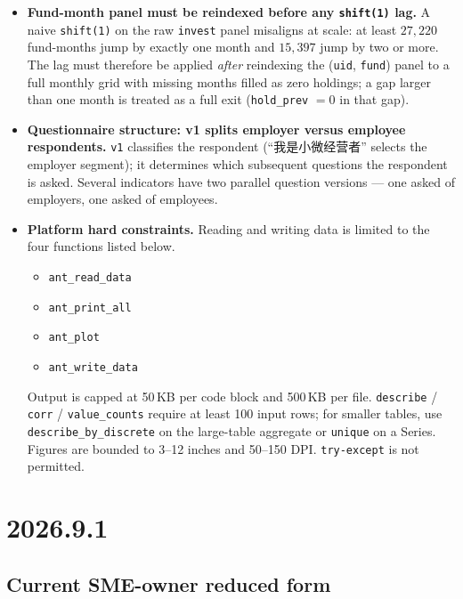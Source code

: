 \documentclass[11pt,letterpaper,english,final]{article}
\begin{document}
\begin{itemize}
\item \textbf{Fund-month panel must be reindexed before any \texttt{shift(1)} lag.} A naive \texttt{shift(1)} on the raw \texttt{invest} panel misaligns at scale: at least $27{,}220$ fund-months jump by exactly one month and $15{,}397$ jump by two or more. The lag must therefore be applied \emph{after} reindexing the (\texttt{uid}, \texttt{fund}) panel to a full monthly grid with missing months filled as zero holdings; a gap larger than one month is treated as a full exit (\texttt{hold\_prev} $=0$ in that gap).

\item \textbf{Questionnaire structure: v1 splits employer versus employee respondents.} \texttt{v1} classifies the respondent (``我是小微经营者'' selects the employer segment); it determines which subsequent questions the respondent is asked. Several indicators have two parallel question versions --- one asked of employers, one asked of employees.

\item \textbf{Platform hard constraints.} Reading and writing data is limited to the four functions listed below.
\begin{itemize}
  \item \texttt{ant\_read\_data}
  \item \texttt{ant\_print\_all}
  \item \texttt{ant\_plot}
  \item \texttt{ant\_write\_data}
\end{itemize}
Output is capped at 50\,KB per code block and 500\,KB per file. \texttt{describe} / \texttt{corr} / \texttt{value\_counts} require at least 100 input rows; for smaller tables, use \texttt{describe\_by\_discrete} on the large-table aggregate or \texttt{unique} on a Series. Figures are bounded to 3--12 inches and 50--150 DPI. \texttt{try-except} is not permitted.

\end{itemize}

\newpage
\section{2026.9.1}
\setcounter{table}{0}

\subsection{Current SME-owner reduced form}
\end{document}
